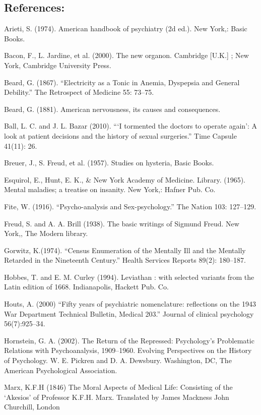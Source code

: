 \subsection{References:}
\label{references:}

Arieti, S. (1974). American handbook of psychiatry (2d ed.). New York,: Basic Books.

Bacon, F., L. Jardine, et al. (2000). The new organon. Cambridge [U.K.] ; New York, Cambridge University Press.

Beard, G. (1867). ``Electricity as a Tonic in Anemia, Dyspepsia and General Debility.'' The Retrospect of Medicine 55: 73--75.

Beard, G. (1881). American nervousness, its causes and consequences. 

Ball, L. C. and J. L. Bazar (2010). ```I tormented the doctors to operate again': A look at patient decisions and the history of sexual surgeries.'' Time Capsule 41(11): 26.

Breuer, J., S. Freud, et al. (1957). Studies on hysteria, Basic Books.

Esquirol, E., Hunt, E. K., \& New York Academy of Medicine. Library. (1965). Mental maladies; a treatise on insanity. New York,: Hafner Pub. Co.

Fite, W. (1916). ``Psycho-analysis and Sex-psychology.'' The Nation 103: 127--129.

Freud, S. and A. A. Brill (1938). The basic writings of Sigmund Freud. New York,, The Modern library.

Gorwitz, K.(1974). ``Census Enumeration of the Mentally Ill and the Mentally Retarded in the Nineteenth Century.'' Health Services Reports 89(2): 180--187.

Hobbes, T. and E. M. Curley (1994). Leviathan : with selected variants from the Latin edition of 1668. Indianapolis, Hackett Pub. Co.

Houts, A. (2000) ``Fifty years of psychiatric nomenclature: reflections on the 1943 War Department Technical Bulletin, Medical 203.'' Journal of clinical psychology 56(7):925--34.

Hornstein, G. A. (2002). The Return of the Repressed: Psychology's Problematic Relations with Psychoanalysis, 1909--1960. Evolving Perspectives on the History of Psychology. W. E. Pickren and D. A. Dewsbury. Washington, DC, The American Psychological Association.

Marx, K.F.H (1846) The Moral Aspects of Medical Life: Consisting of the `Akesios' of Professor K.F.H. Marx. Translated by James Mackness John Churchill, London

